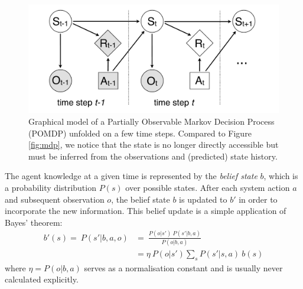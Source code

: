 \begin{figure}[h]
\centering
\includegraphics[scale=0.25]{imgs/POMDP.pdf}
\caption{Graphical model of a Partially Observable Markov Decision Process (POMDP) unfolded on a few time steps.  Compared to Figure \ref{fig:mdp}, we notice that the state is no longer directly accessible but must be inferred from the observations and (predicted) state history. }
\label{fig:pomdp}
\end{figure}

The agent knowledge at a given time is represented by the \textit{belief state} $b$, which is a probability distribution $P(s)$ over possible states.  After each system action $a$ and subsequent observation $o$, the belief state $b$ is updated to $b'$ in order to incorporate the new information.  This belief update is a simple application of Bayes' theorem:
\begin{align}
b'(s) = \ \!P(s'|b, a,o) & = \ \frac{P(o|s') \ P(s'|b,a)}{P(o|b,a)} \\[3mm]
& = \eta \ P(o|s') \sum_{s} P(s'|s,a) \ b(s) \label{eq:update}
\end{align}
where $\eta = P(o|b,a)$ serves as a normalisation constant and is usually never calculated explicitly. 

